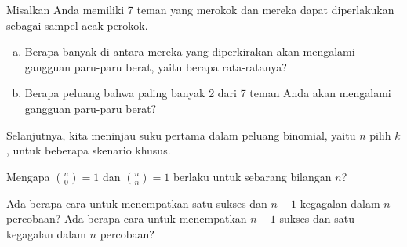 \begin{exercisewrap}
\begin{nexercise}
Misalkan Anda memiliki 7 teman yang merokok dan mereka dapat diperlakukan
sebagai sampel acak perokok.\footnotemark{}
\begin{enumerate}[(a)]
\setlength{\itemsep}{0mm}
\item
    Berapa banyak di antara mereka yang diperkirakan akan mengalami
    gangguan paru-paru berat, yaitu berapa rata-ratanya?
\item
    Berapa peluang bahwa paling banyak 2 dari 7 teman Anda akan mengalami
    gangguan paru-paru berat?
\end{enumerate}
\end{nexercise}
\end{exercisewrap}

Selanjutnya, kita meninjau suku pertama dalam peluang binomial, yaitu
$n$ pilih $k$, untuk beberapa skenario khusus.

\begin{exercisewrap}
\begin{nexercise}
Mengapa ${n \choose 0}=1$ dan ${n \choose n}=1$ berlaku untuk sebarang
bilangan $n$?\footnotemark{}
\end{nexercise}
\end{exercisewrap}

\begin{exercisewrap}
\begin{nexercise}
Ada berapa cara untuk menempatkan satu sukses dan $n-1$ kegagalan dalam
$n$ percobaan? Ada berapa cara untuk menempatkan $n-1$ sukses dan satu
kegagalan dalam $n$ percobaan?\footnotemark{}
\end{nexercise}
\end{exercisewrap}


